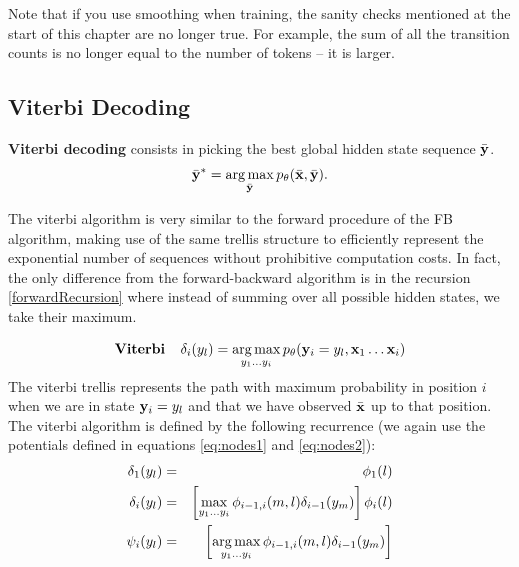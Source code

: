 Note that if you use smoothing when training, the sanity checks mentioned at the start of this chapter are no longer true. For example, the sum of all the transition counts is no longer equal to the number of tokens -- it is larger.

%


\subsection{Viterbi Decoding}


\textbf{Viterbi decoding} consists in
picking the best global hidden state sequence $\bar{\mathbf{y}}$. 
\begin{equation}
\bar{\mathbf{y}}^* = \operatorname*{arg\,max}_{\bar{\mathbf{y}}} p_{\theta}(\bar{\mathbf{x}} ,\bar{\mathbf{y}}).
\end{equation}

The viterbi algorithm 
is very similar to the forward procedure of the FB algorithm,
making use of the same trellis structure to efficiently represent the exponential number of sequences without prohibitive computation costs. In fact, the only
difference from the forward-backward algorithm is in the recursion
\ref{forwardRecursion} where instead of summing over all possible 
hidden states, we take their maximum.

\begin{equation}
\label{eq::viterbi}
\mathbf{Viterbi }\;\;\;\;  \delta_i({y}_l) = \operatorname*{arg\,max}_{y_1...y_i} p_{\theta}(\mathbf{y}_i = {y}_l , \mathbf{x}_1 \ldots \mathbf{x}_i)
\end{equation}
The viterbi trellis represents the path with maximum probability in
position
$i$ when we are in state $\mathbf{y}_i = {y}_l$ and that we have observed $\bar{\mathbf{x}}$
up to that position. The viterbi algorithm is defined by the
following recurrence (we again use the potentials defined in equations \eqref{eq:nodes1} and \eqref{eq:nodes2}): 
\begin{eqnarray}
\delta_1({y}_l) &=& \phi_1(l) \\
\delta_i({y}_l) &=& \left[ \max_{y_1 ... y_i} \phi_{i-1,i}(m,l)
  \delta_{i-1}({y}_m) \right] \phi_i(l) \label{viterbiRecursion} \\
\psi_{i}({y}_l) &=& \left[ \operatorname*{arg\,max}_{y_1 ... y_i} \phi_{i-1,i}(m,l)
  \delta_{i-1}({y}_m) \right]
\end{eqnarray}

